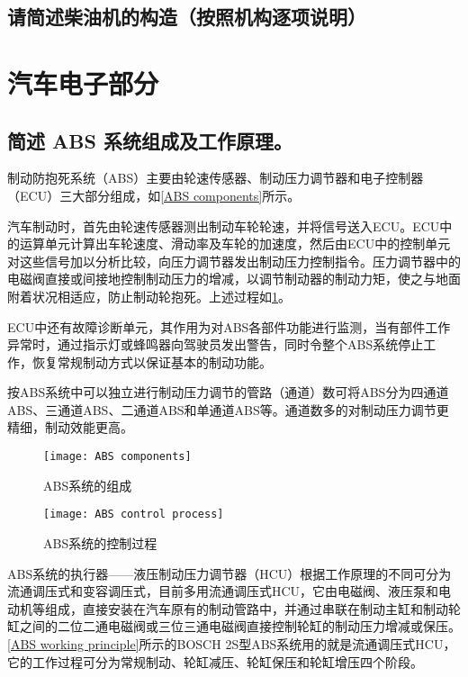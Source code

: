 \documentclass[UTF8]{ctexart}
\numberwithin{figure}{section}
\numberwithin{table}{section}
\begin{document}
\subsection{请简述柴油机的构造（按照机构逐项说明）}
\clearpage

\section{汽车电子部分}
\subsection{简述 ABS 系统组成及工作原理。}

制动防抱死系统（ABS）主要由轮速传感器、制动压力调节器和电子控制器（ECU）三大部分组成，如\cref{ABS components}所示。

汽车制动时，首先由轮速传感器测出制动车轮轮速，并将信号送入ECU。ECU中的运算单元计算出车轮速度、滑动率及车轮的加速度，然后由ECU中的控制单元对这些信号加以分析比较，向压力调节器发出制动压力控制指令。压力调节器中的电磁阀直接或间接地控制制动压力的增减，以调节制动器的制动力矩，使之与地面附着状况相适应，防止制动轮抱死。上述过程如\cref{ABS control process}。

ECU中还有故障诊断单元，其作用为对ABS各部件功能进行监测，当有部件工作异常时，通过指示灯或蜂鸣器向驾驶员发出警告，同时令整个ABS系统停止工作，恢复常规制动方式以保证基本的制动功能。

按ABS系统中可以独立进行制动压力调节的管路（通道）数可将ABS分为四通道ABS、三通道ABS、二通道ABS和单通道ABS等。通道数多的对制动压力调节更精细，制动效能更高。

\begin{figure}[htbp]
	\centering
	\begin{minipage}[b]{0.8\textwidth}
		\centering
		\texttt{[image: ABS components]}
		\caption{ABS系统的组成}
		\label{ABS components}
	\end{minipage}
	\begin{minipage}[b]{0.8\textwidth}
		\centering
		\texttt{[image: ABS control process]}
		\caption{ABS系统的控制过程}
		\label{ABS control process}
	\end{minipage}
\end{figure}

ABS系统的执行器——液压制动压力调节器（HCU）根据工作原理的不同可分为流通调压式和变容调压式，目前多用流通调压式HCU，它由电磁阀、液压泵和电动机等组成，直接安装在汽车原有的制动管路中，并通过串联在制动主缸和制动轮缸之间的二位二通电磁阀或三位三通电磁阀直接控制轮缸的制动压力增减或保压。\cref{ABS working principle}所示的BOSCH 2S型ABS系统用的就是流通调压式HCU，它的工作过程可分为常规制动、轮缸减压、轮缸保压和轮缸增压四个阶段。
\end{document}
